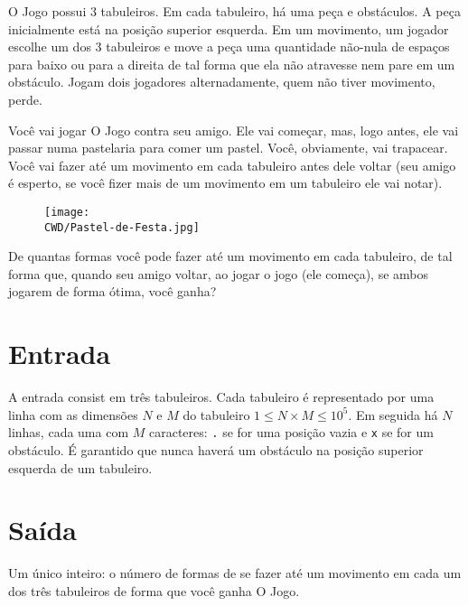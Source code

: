 %

O Jogo possui 3 tabuleiros. Em cada tabuleiro, há uma peça e obstáculos. A peça inicialmente está na posição superior esquerda. Em um movimento, um jogador escolhe um dos 3 tabuleiros e move a peça uma quantidade não-nula de espaços para baixo ou para a direita de tal forma que ela não atravesse nem pare em um obstáculo. Jogam dois jogadores alternadamente, quem não tiver movimento, perde.

Você vai jogar O Jogo contra seu amigo. Ele vai começar, mas, logo antes, ele vai passar numa pastelaria para comer um pastel. Você, obviamente, vai trapacear. Você vai fazer até um movimento em cada tabuleiro antes dele voltar (seu amigo é esperto, se você fizer mais de um movimento em um tabuleiro ele vai notar).

\begin{figure}[H]
    \centering
    \texttt{[image: \\CWD/Pastel-de-Festa.jpg]}
  \end{figure}

De quantas formas você pode fazer até um movimento em cada tabuleiro, de tal forma que, quando seu amigo voltar, ao jogar o jogo (ele começa), se ambos jogarem de forma ótima, você ganha?

%
%

\section*{Entrada}

A entrada consist em três tabuleiros. Cada tabuleiro é representado por uma linha com as dimensões $N$ e $M$ do tabuleiro $1 \leq N\times M \leq 10^5$. Em seguida há $N$ linhas, cada uma com $M$ caracteres: {\tt .} se for uma posição vazia e {\tt x} se for um obstáculo. É garantido que nunca haverá um obstáculo na posição superior esquerda de um tabuleiro.

%
%

\section*{Saída}

Um único inteiro: o número de formas de se fazer até um movimento em cada um dos três tabuleiros de forma que você ganha O Jogo.

